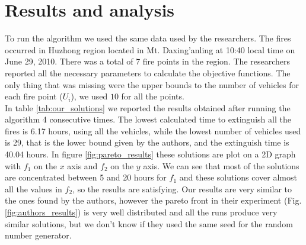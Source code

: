 \section{Results and analysis}
To run the algorithm we used the same data used by the researchers. The fires occurred in Huzhong region located in
Mt. Daxing’anling at 10:40 local time on June 29, 2010. There was a total of 7 fire points in the region. The researchers reported
all the necessary parameters to calculate the objective functions. The only thing that was missing were the upper bounds to the number
of vehicles for each fire point ($U_i$), we used $10$ for all the points.\\
In table \ref{tab:our_solutions} we reported the results obtained after running 
the algorithm 4 consecutive times. The lowest calculated time to extinguish all
the fires is 6.17 hours, using all the vehicles, while the lowest number of
vehicles used is 29, that is the lower bound given by the authors, and the extinguish
time is 40.04 hours. In figure \ref{fig:pareto_results} these solutions are plot on a 2D graph with 
$f_1$ on the $x$ axis and $f_2$ on the $y$ axis. We can see that most of the solutions are concentrated 
between 5 and 20 hours for $f_1$ and these solutions cover almost all the values in $f_2$, so the results are satisfying. 
Our results are very similar to the ones found by the authors, however the pareto front in their experiment (Fig. \ref{fig:authors_results}) is very well distributed and 
all the runs produce very similar solutions, but we don't know if they used the same seed for the random number generator.
\newpage
